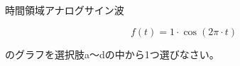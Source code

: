時間領域アナログサイン波

\[
f(t) = 1 \cdot \cos( 2 \pi \cdot t )
\]

\bigskip
\noindent  のグラフを選択肢a〜dの中から1つ選びなさい。
